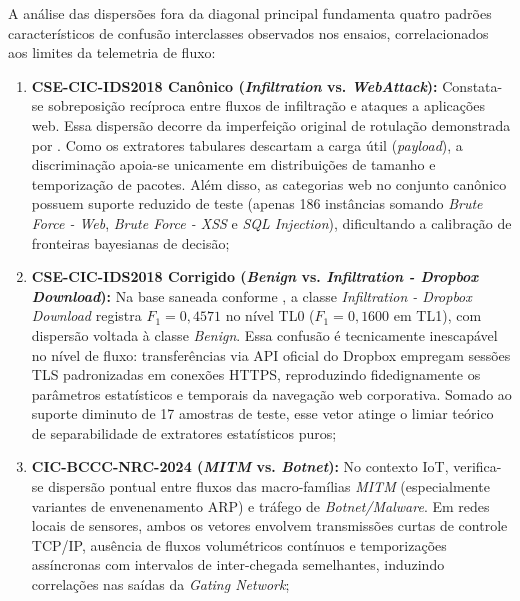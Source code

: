 A análise das dispersões fora da diagonal principal fundamenta quatro padrões característicos de
confusão interclasses observados nos ensaios, correlacionados aos limites da telemetria de fluxo:
\begin{enumerate}
    \item \textbf{CSE-CIC-IDS2018 Canônico (\emph{Infiltration} vs. \emph{WebAttack}):}
    Constata-se sobreposição recíproca entre fluxos de infiltração e ataques a aplicações web. Essa
    dispersão decorre da imperfeição original de rotulação demonstrada por .
    Como os extratores tabulares descartam a carga útil (\emph{payload}), a discriminação apoia-se
    unicamente em distribuições de tamanho e temporização de pacotes. Além disso, as categorias web
    no conjunto canônico possuem suporte reduzido de teste (apenas 186 instâncias somando
    \emph{Brute Force - Web}, \emph{Brute Force - XSS} e \emph{SQL Injection}), dificultando a
    calibração de fronteiras bayesianas de decisão;
    
    \item \textbf{CSE-CIC-IDS2018 Corrigido (\emph{Benign} vs. \emph{Infiltration - Dropbox Download}):}
    Na base saneada conforme , a classe \emph{Infiltration - Dropbox Download}
    registra $F_1 = 0{,}4571$ no nível TL0 ($F_1 = 0{,}1600$ em TL1), com dispersão voltada à classe
    \emph{Benign}. Essa confusão é tecnicamente inescapável no nível de fluxo: transferências via
    API oficial do Dropbox empregam sessões TLS padronizadas em conexões HTTPS, reproduzindo
    fidedignamente os parâmetros estatísticos e temporais da navegação web corporativa. Somado ao
    suporte diminuto de 17 amostras de teste, esse vetor atinge o limiar teórico de separabilidade de
    extratores estatísticos puros;
    
    \item \textbf{CIC-BCCC-NRC-2024 (\emph{MITM} vs. \emph{Botnet}):}
    No contexto IoT, verifica-se dispersão pontual entre fluxos das macro-famílias \emph{MITM}
    (especialmente variantes de envenenamento ARP) e tráfego de \emph{Botnet/Malware}. Em redes locais
    de sensores, ambos os vetores envolvem transmissões curtas de controle TCP/IP, ausência de fluxos
    volumétricos contínuos e temporizações assíncronas com intervalos de inter-chegada semelhantes,
    induzindo correlações nas saídas da \emph{Gating Network};
    

\end{enumerate}
